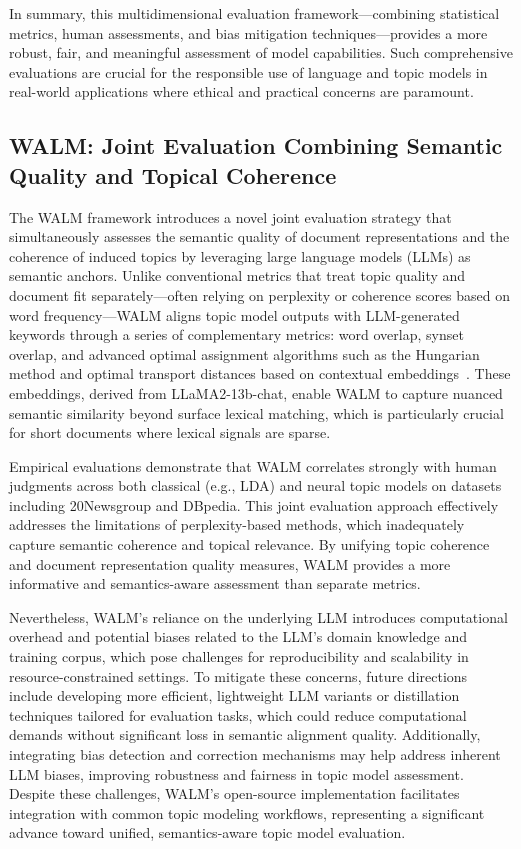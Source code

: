 \documentclass[sigconf]{acmart}
\begin{document}
In summary, this multidimensional evaluation framework—combining statistical metrics, human assessments, and bias mitigation techniques—provides a more robust, fair, and meaningful assessment of model capabilities. Such comprehensive evaluations are crucial for the responsible use of language and topic models in real-world applications where ethical and practical concerns are paramount.

\subsection{WALM: Joint Evaluation Combining Semantic Quality and Topical Coherence}

The WALM framework introduces a novel joint evaluation strategy that simultaneously assesses the semantic quality of document representations and the coherence of induced topics by leveraging large language models (LLMs) as semantic anchors. Unlike conventional metrics that treat topic quality and document fit separately—often relying on perplexity or coherence scores based on word frequency—WALM aligns topic model outputs with LLM-generated keywords through a series of complementary metrics: word overlap, synset overlap, and advanced optimal assignment algorithms such as the Hungarian method and optimal transport distances based on contextual embeddings~\cite{ref47}. These embeddings, derived from LLaMA2-13b-chat, enable WALM to capture nuanced semantic similarity beyond surface lexical matching, which is particularly crucial for short documents where lexical signals are sparse.

Empirical evaluations demonstrate that WALM correlates strongly with human judgments across both classical (e.g., LDA) and neural topic models on datasets including 20Newsgroup and DBpedia. This joint evaluation approach effectively addresses the limitations of perplexity-based methods, which inadequately capture semantic coherence and topical relevance. By unifying topic coherence and document representation quality measures, WALM provides a more informative and semantics-aware assessment than separate metrics.

Nevertheless, WALM’s reliance on the underlying LLM introduces computational overhead and potential biases related to the LLM’s domain knowledge and training corpus, which pose challenges for reproducibility and scalability in resource-constrained settings. To mitigate these concerns, future directions include developing more efficient, lightweight LLM variants or distillation techniques tailored for evaluation tasks, which could reduce computational demands without significant loss in semantic alignment quality. Additionally, integrating bias detection and correction mechanisms may help address inherent LLM biases, improving robustness and fairness in topic model assessment. Despite these challenges, WALM’s open-source implementation facilitates integration with common topic modeling workflows, representing a significant advance toward unified, semantics-aware topic model evaluation.
\end{document}
